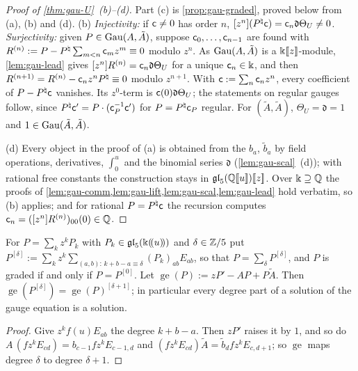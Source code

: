 \begin{proof}[Proof of \cref{thm:gau-U}~(b)--(d)]
Part (c) is \cref{prop:gau-graded}, proved below from (a), (b) and (d). (b) \emph{Injectivity:} if $\mathsf{c}\neq0$ has order $n$, $[z^n](P^\natural\mathsf{c})=\mathsf{c}_n\mathfrak d\Theta_U\neq0$. \emph{Surjectivity:} given $P\in\operatorname{Gau}(A,\tilde A)$, suppose $\mathsf{c}_0,\dots,\mathsf{c}_{n-1}$ are found with $R^{(n)}:=P-P^\natural\sum_{m<n}\mathsf{c}_mz^m\equiv0$ modulo $z^n$. As $\operatorname{Gau}(A,\tilde A)$ is a $\Bbbk[\![ z ]\!]$-module, \cref{lem:gau-lead} gives $[z^n]R^{(n)}=\mathsf{c}_n\mathfrak d\Theta_U$ for a unique $\mathsf{c}_n\in\Bbbk$, and then $R^{(n+1)}=R^{(n)}-\mathsf{c}_nz^nP^\natural\equiv0$ modulo $z^{n+1}$. With $\mathsf{c}:=\sum_n\mathsf{c}_nz^n$, every coefficient of $P-P^\natural\mathsf{c}$ vanishes. Its $z^0$-term is $\mathsf{c}(0)\mathfrak d\Theta_U$; the statements on regular gauges follow, since $P^\natural\mathsf{c}'=P\cdot(\mathsf{c}_P^{-1}\mathsf{c}')$ for $P=P^\natural\mathsf{c}_P$ regular. For $(\tilde A,\tilde A)$, $\Theta_U=\mathfrak d=1$ and $1\in\operatorname{Gau}(\tilde A,\tilde A)$.

(d) Every object in the proof of (a) is obtained from the $b_a$, $\tilde b_a$ by field operations, derivatives, $\int_0^u$ and the binomial series $\mathfrak d$ (\cref{lem:gau-scal}~(d)); with rational free constants the construction stays in $\mathfrak{gl}_5(\mathbb{Q}[\![ u ]\!])[\![ z ]\!]$. Over $\Bbbk\supseteq\mathbb{Q}$ the proofs of \cref{lem:gau-comm,lem:gau-lift,lem:gau-scal,lem:gau-lead} hold verbatim, so (b) applies; and for rational $P=P^\natural\mathsf{c}$ the recursion computes $\mathsf{c}_n=([z^n]R^{(n)})_{00}(0)\in\mathbb{Q}$.
\end{proof}

\begin{lem}
\label{lem:gau-degree}
For $P=\sum_kz^kP_k$ with $P_k\in\mathfrak{gl}_5(\Bbbk(\!(u)\!))$ and $\delta\in\mathbb{Z}/5$ put $P^{[\delta]}:=\sum_kz^k\sum_{(a,b):\,k+b-a\equiv\delta}(P_k)_{ab}E_{ab}$, so that $P=\sum_\delta P^{[\delta]}$, and $P$ is graded if and only if $P=P^{[0]}$. Let $\operatorname{ge}(P):=zP'-AP+P\tilde A$. Then $\operatorname{ge}(P^{[\delta]})=\operatorname{ge}(P)^{[\delta+1]}$; in particular every degree part of a solution of the gauge equation is a solution.
\end{lem}

\begin{proof}
Give $z^kf(u)E_{ab}$ the degree $k+b-a$. Then $zP'$ raises it by $1$, and so do $A\,(fz^kE_{cd})=b_{c-1}fz^kE_{c-1,d}$ and $(fz^kE_{cd})\tilde A=\tilde b_dfz^kE_{c,d+1}$; so $\operatorname{ge}$ maps degree $\delta$ to degree $\delta+1$.
\end{proof}

